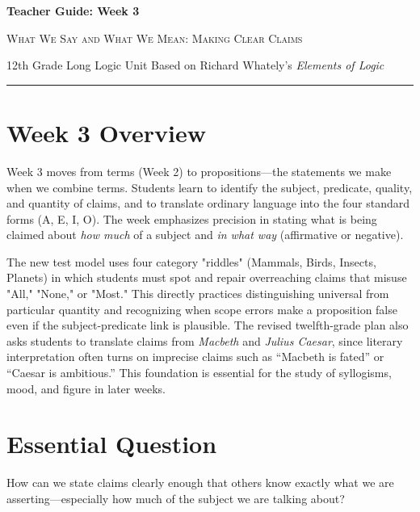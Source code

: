 \documentclass[12pt]{article}
\begin{document}
\begin{center}
{\LARGE\bfseries Teacher Guide: Week 3}\par\vspace{0.25em}
{\large\scshape What We Say and What We Mean: Making Clear Claims}\par\vspace{0.4em}
{12th Grade Long Logic Unit Based on Richard Whately's \textit{Elements of Logic}}\par\vspace{0.6em}
\rule{0.82\textwidth}{0.4pt}
\end{center}

\section*{Week 3 Overview}
Week 3 moves from terms (Week 2) to propositions—the statements we make when we combine terms. Students learn to identify the subject, predicate, quality, and quantity of claims, and to translate ordinary language into the four standard forms (A, E, I, O). The week emphasizes precision in stating what is being claimed about \emph{how much} of a subject and \emph{in what way} (affirmative or negative). 

The new test model uses four category "riddles" (Mammals, Birds, Insects, Planets) in which students must spot and repair overreaching claims that misuse "All," "None," or "Most." This directly practices distinguishing universal from particular quantity and recognizing when scope errors make a proposition false even if the subject-predicate link is plausible. The revised twelfth-grade plan also asks students to translate claims from \textit{Macbeth} and \textit{Julius Caesar}, since literary interpretation often turns on imprecise claims such as “Macbeth is fated” or “Caesar is ambitious.” This foundation is essential for the study of syllogisms, mood, and figure in later weeks.

\section*{Essential Question}
How can we state claims clearly enough that others know exactly what we are asserting—especially how much of the subject we are talking about?
\end{document}
